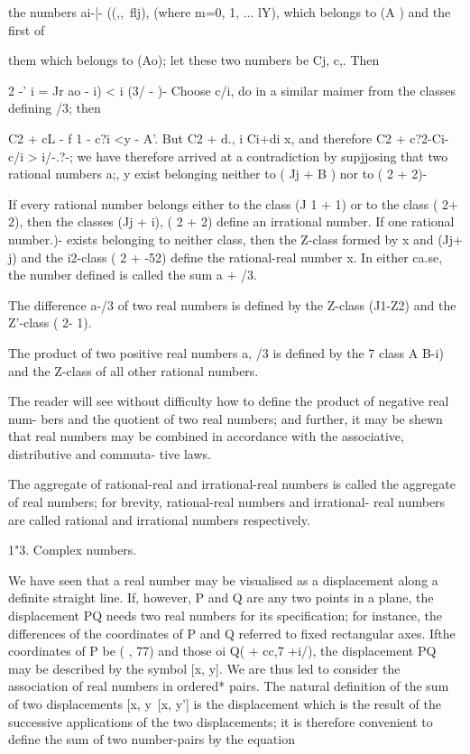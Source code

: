 the numbers ai-|- ((,,\ flj), (where m=0, 1, ... lY), which belongs to
(A ) and the first of

them which belongs to (Ao); let these two numbers be Cj, c,. Then

 2 -' i = Jr ao - i) < i (3/ - )- Choose c/i, do in a similar maimer
from the classes defining /3; then

C2 + cL - f 1 - c?i <y - A'. But C2 + d., i Ci+di x, and therefore C2
+ c?2-Ci-c/i > i/-.?-; we have therefore arrived at a contradiction by
supjjosing that two rational numbers a;, y exist belonging neither to
( Jj + B ) nor to ( 2 + 2)-

If every rational number belongs either to the class (J 1 + 1) or to
the class ( 2+ 2), then the classes (Jj + i), ( 2 + 2) define an
irrational number. If one rational number.)- exists belonging to
neither class, then the Z-class formed by x and (Jj+ j) and the
i2-class ( 2 + -52) define the rational-real number x. In either
ca.se, the number defined is called the sum a + /3.

The difference a-/3 of two real numbers is defined by the Z-class
(J1-Z2) and the Z'-class ( 2- 1).

The product of two positive real numbers a, /3 is defined by the 7
class A B-i) and the Z-class of all other rational numbers.

The reader will see without difficulty how to define the product of
negative real num- bers and the quotient of two real numbers; and
further, it may be shewn that real numbers may be combined in
accordance with the associative, distributive and commuta- tive laws.

The aggregate of rational-real and irrational-real numbers is called
the aggregate of real numbers; for brevity, rational-real numbers and
irrational- real numbers are called rational and irrational numbers
respectively.

1"3. Complex numbers.

We have seen that a real number may be visualised as a displacement
along a definite straight line. If, however, P and Q are any two
points in a plane, the displacement PQ needs two real numbers for its
specification; for instance, the differences of the coordinates of P
and Q referred to fixed rectangular axes. Ifthe coordinates of P be (
, 77) and those oi Q( + cc,7 +i/), the displacement PQ may be
described by the symbol [x, y]. We are thus led to consider the
association of real numbers in ordered* pairs. The natural definition
of the sum of two displacements [x, y\ [x, y'] is the displacement
which is the result of the successive applications of the two
displacements; it is therefore convenient to define the sum of two
number-pairs by the equation

